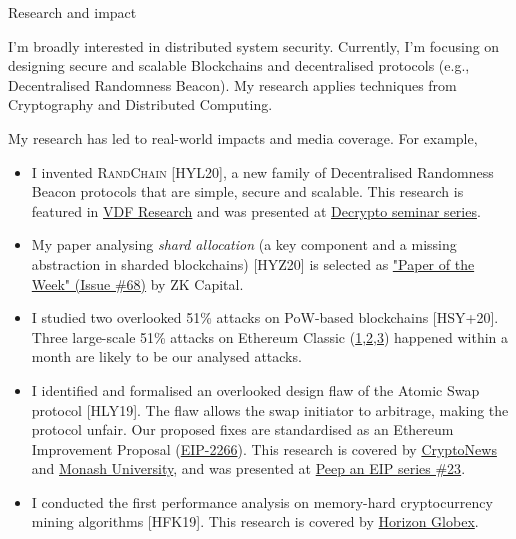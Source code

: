 \documentclass{resume} %
\begin{document}
\begin{rSection}{Research and impact}

    I'm broadly interested in distributed system security.
    Currently, I'm focusing on designing secure and scalable Blockchains and decentralised protocols (e.g., Decentralised Randomness Beacon).
    My research applies techniques from Cryptography and Distributed Computing.

    My research has led to real-world impacts and media coverage. For example,
    \begin{itemize}
        \item I invented \textsc{RandChain} [HYL20], a new family of Decentralised Randomness Beacon protocols that are simple, secure and scalable. This research is featured in \href{https://vdfresearch.org/}{VDF Research} and was presented at \href{https://decrypto.org/seminar/}{Decrypto seminar series}.
        \item My paper analysing \emph{shard allocation} (a key component and a missing abstraction in sharded blockchains) [HYZ20] is selected as \href{https://zkcapital.substack.com/}{"Paper of the Week" (Issue \#68)} by ZK Capital.
        \item I studied two overlooked 51\% attacks on PoW-based blockchains [HSY+20]. Three large-scale 51\% attacks on Ethereum Classic (\href{https://news.bitcoin.com/ethereum-classic-suffers-51-attack-again-delisting-risk-amplified}{1},\href{https://decrypt.co/40196/hackers-launch-third-51-attack-on-ethereum-classic-this-month}{2},\href{https://coingeek.com/over-1m-double-spent-in-latest-ethereum-classic-51-attack}{3}) happened within a month are likely to be our analysed attacks.
        \item I identified and formalised an overlooked design flaw of the Atomic Swap protocol [HLY19]. The flaw allows the swap initiator to arbitrage, making the protocol unfair. Our proposed fixes are standardised as an Ethereum Improvement Proposal (\href{https://github.com/ethereum/EIPs/issues/2266}{EIP-2266}). This research is covered by \href{https://cryptonews.com.au/monash-university-researchers-developing-cryptocurrency-transaction-platform}{CryptoNews} and \href{https://www.monash.edu/blockchain/news/to-realise-their-potential,-business-blockchains-must-learn-to-communicate}{Monash University}, and was presented at \href{https://www.youtube.com/watch?v=wwWcfl9N65k}{Peep an EIP series \#23}.
        \item I conducted the first performance analysis on memory-hard cryptocurrency mining algorithms [HFK19]. This research is covered by \href{https://medium.com/@horizonfintex/blockchain-research-bytes-1-9d023e080765}{Horizon Globex}.
    \end{itemize}


\end{rSection}
\end{document}
